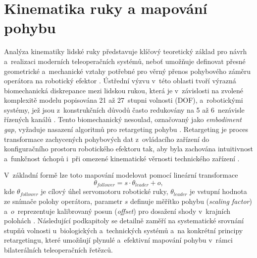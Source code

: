 \section{Kinematika ruky a mapování pohybu}
Analýza kinematiky lidské ruky představuje klíčový teoretický základ pro návrh a~realizaci moderních teleoperačních systémů, neboť umožňuje definovat přesné geometrické a~mechanické vztahy potřebné pro věrný přenos pohybového záměru operátora na robotický efektor \cite{Belcamino2024, GIUDICI2025, Mizrahi2023}.
Ústřední výzvu v~této oblasti tvoří výrazná biomechanická diskrepance mezi lidskou rukou, která je v~závislosti na zvolené komplexitě modelu popisována 21 až 27~stupni volnosti (DOF), a~robotickými systémy, jež jsou z~konstrukčních důvodů často redukovány na 5 až 6~nezávisle řízených kanálů \cite{Belcamino2024, Devaraja20201222, Zhang2025}.
Tento biomechanický nesoulad, označovaný jako \textit{embodiment gap}, vyžaduje nasazení algoritmů pro retargeting pohybu \cite{Zhang2025}.
Retargeting je proces transformace zachycených pohybových dat z~ovládacího zařízení do konfiguračního prostoru robotického efektoru tak, aby byla zachována intuitivnost a~funkčnost úchopů i~při omezené kinematické věrnosti technického zařízení \cite{GIUDICI2025, Zhang2025}.

V~základní formě lze toto mapování modelovat pomocí lineární transformace
%
\begin{equation}
    \theta_{follower} = s \cdot \theta_{leader} + o,
\end{equation}
%
kde $\theta_{follower}$ je cílový úhel servomotoru robotické ruky, $\theta_{leader}$ je vstupní hodnota ze snímače polohy operátora, parametr $s$ definuje měřítko pohybu (\textit{scaling factor}) a~$o$~reprezentuje kalibrovaný posun (\textit{offset}) pro dosažení shody v~krajních polohách \cite{Zhang2025, Mizrahi2023}.
Následující podkapitoly se detailně zaměří na systematické srovnání stupňů volnosti u~biologických a~technických systémů a~na konkrétní principy retargetingu, které umožňují plynulé a~efektivní mapování pohybu v~rámci bilaterálních teleoperačních řetězců.

